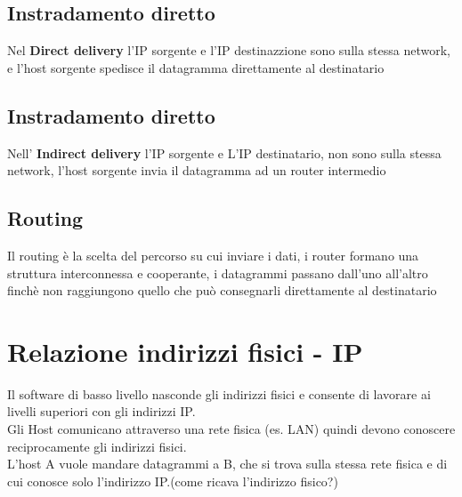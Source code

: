 \documentclass{report}
\begin{document}
                \subsection{Instradamento diretto}
                    Nel \textbf{Direct delivery} l'IP sorgente e l'IP destinazzione sono sulla stessa network, e l'host sorgente spedisce il datagramma direttamente al destinatario
                \subsection{Instradamento diretto}
                    Nell' \textbf{Indirect delivery} l'IP sorgente e L'IP destinatario, non sono sulla stessa network, l'host sorgente invia il datagramma ad un router intermedio
                \subsection{Routing}
                    Il routing è la scelta del percorso su cui inviare i dati, i router formano una struttura interconnessa e cooperante, i datagrammi passano dall'uno all'altro finchè non raggiungono quello che può consegnarli direttamente al destinatario 
            \section{Relazione indirizzi fisici - IP}
                Il software di basso livello nasconde gli indirizzi fisici e consente di lavorare ai livelli superiori con gli indirizzi IP.
                \\
                Gli Host comunicano attraverso una rete fisica (es. LAN) quindi devono conoscere reciprocamente gli indirizzi fisici.
                \\
                L'host A vuole mandare datagrammi a B, che si trova sulla stessa rete fisica e di cui conosce solo l'indirizzo IP.(come ricava l'indirizzo fisico?)
\end{document}
